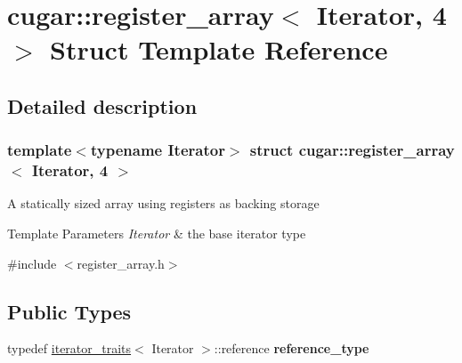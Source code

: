 \hypertarget{structcugar_1_1register__array_3_01_iterator_00_014_01_4}{}\section{cugar\+:\+:register\+\_\+array$<$ Iterator, 4 $>$ Struct Template Reference}
\label{structcugar_1_1register__array_3_01_iterator_00_014_01_4}


\subsection{Detailed description}
\subsubsection*{template$<$typename Iterator$>$\newline
struct cugar\+::register\+\_\+array$<$ Iterator, 4 $>$}

A statically sized array using registers as backing storage


\begin{DoxyTemplParams}{Template Parameters}
{\em Iterator} & the base iterator type \\
\hline
\end{DoxyTemplParams}


{\ttfamily \#include $<$register\+\_\+array.\+h$>$}

\subsection*{Public Types}
\begin{DoxyCompactItemize}
\item 
\mbox{\label{structcugar_1_1register__array_3_01_iterator_00_014_01_4_a8b7ed4e30675f4978a6a9fdfe572716e}} 
typedef \hyperlink{structcugar_1_1iterator__traits}{iterator\+\_\+traits}$<$ Iterator $>$\+::reference {\bfseries reference\+\_\+type}
\end{DoxyCompactItemize}
